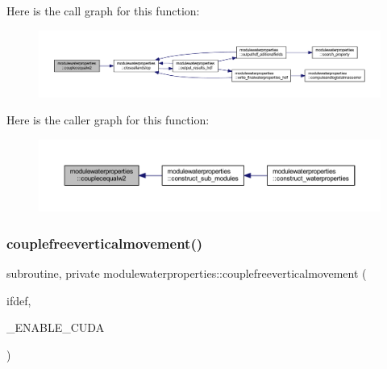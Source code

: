 Here is the call graph for this function\+:\nopagebreak
\begin{figure}[H]
\begin{center}
\leavevmode
\includegraphics[width=350pt]{namespacemodulewaterproperties_a7478a221b172ba61186f09416e5b3b0d_cgraph}
\end{center}
\end{figure}
Here is the caller graph for this function\+:\nopagebreak
\begin{figure}[H]
\begin{center}
\leavevmode
\includegraphics[width=350pt]{namespacemodulewaterproperties_a7478a221b172ba61186f09416e5b3b0d_icgraph}
\end{center}
\end{figure}
\mbox{\label{namespacemodulewaterproperties_ab19037aba70755844475216443ec3a35}} 
\subsubsection{\texorpdfstring{couplefreeverticalmovement()}{couplefreeverticalmovement()}}
{\footnotesize\ttfamily subroutine, private modulewaterproperties\+::couplefreeverticalmovement (\begin{DoxyParamCaption}\item[{}]{ifdef,  }\item[{}]{\+\_\+\+E\+N\+A\+B\+L\+E\+\_\+\+C\+U\+DA }\end{DoxyParamCaption})\hspace{0.3cm}{\ttfamily [private]}}

